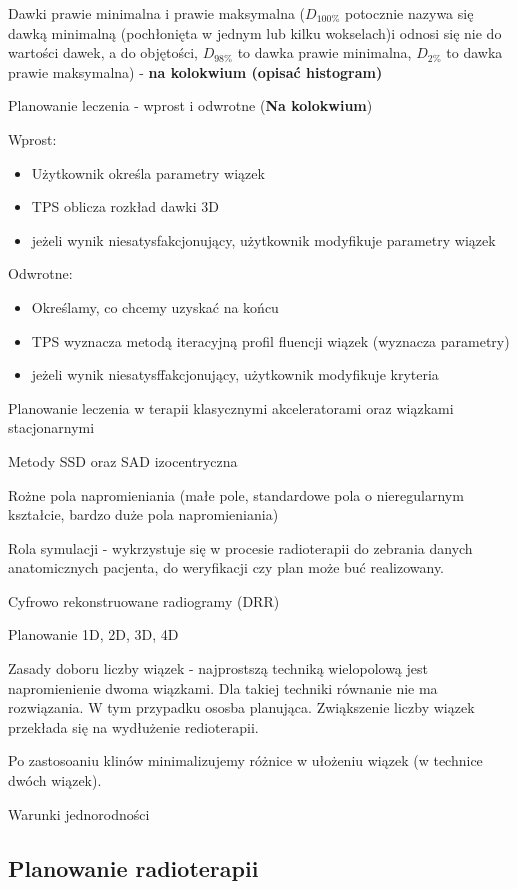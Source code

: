 \documentclass{article}
\begin{document}
Dawki prawie minimalna i prawie maksymalna ($D_{100\%}$ potocznie nazywa się dawką minimalną (pochłonięta w jednym lub kilku wokselach)i odnosi się nie do wartości dawek, a do objętości, $D_{98\%}$ to dawka prawie minimalna, $D_{2\%}$ to dawka prawie maksymalna) - \textbf{na kolokwium (opisać histogram)}

Planowanie leczenia - wprost i odwrotne (\textbf{Na kolokwium})

Wprost:
\begin{itemize}
    \item Użytkownik określa parametry wiązek
    \item TPS oblicza rozkład dawki 3D
    \item jeżeli wynik niesatysfakcjonujący, użytkownik modyfikuje parametry wiązek
\end{itemize}

Odwrotne:
\begin{itemize}
    \item Określamy, co chcemy uzyskać na końcu
    \item TPS wyznacza metodą iteracyjną profil fluencji wiązek (wyznacza parametry)
    \item jeżeli wynik niesatysffakcjonujący, użytkownik modyfikuje kryteria
\end{itemize}

Planowanie leczenia w terapii klasycznymi akceleratorami oraz wiązkami stacjonarnymi

Metody SSD oraz SAD izocentryczna

Rożne pola napromieniania (małe pole, standardowe pola o nieregularnym kształcie, bardzo duże pola napromieniania)

Rola symulacji - wykrzystuje się w procesie radioterapii do zebrania danych anatomicznych pacjenta, do weryfikacji czy plan może buć realizowany.

Cyfrowo rekonstruowane radiogramy (DRR)

Planowanie 1D, 2D, 3D, 4D

Zasady doboru liczby wiązek - najprostszą techniką wielopolową jest napromienienie dwoma wiązkami. Dla takiej techniki równanie nie ma rozwiązania. W tym przypadku ososba planująca. Zwiąkszenie liczby wiązek przekłada się na wydłużenie redioterapii.

Po zastosoaniu klinów minimalizujemy różnice w ułożeniu wiązek (w technice dwóch wiązek).

Warunki jednorodności

\subsection{Planowanie radioterapii}
\end{document}

